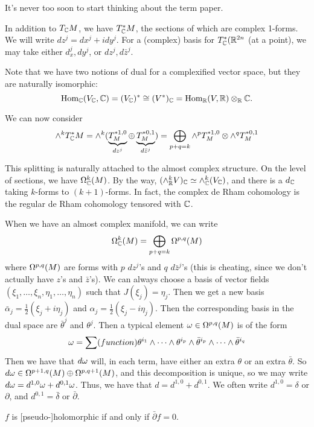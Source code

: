  \setcounter{lecture}{8}

 It's never too soon to start thinking about the term paper.

 In addition to $T_{\mathbb{C}} M$, we have $T_{\mathbb{C}}^* M$, the sections of
 which are complex 1-forms.  We will write $dz^j=dx^j+idy^j$.  For
 a (complex) basis for $T_{\mathbb{C}}^*(\mathbb{R}^{2n}$ (at a point), we may
 take either $d_x^j,dy^j$, or $dz^j,d\bar z^j$.

 Note that we have two notions of dual for a complexified vector
 space, but they are naturally isomorphic:
 \[\text{\rm Hom}_{\mathbb{C}}(V_{\mathbb{C}},\mathbb{C})=(V_{\mathbb{C}})^* \cong (V^*)_{\mathbb{C}} = \text{\rm Hom}_{\mathbb{R}}
 (V,\mathbb{R})\otimes_{\mathbb{R}} \mathbb{C}.\]

 We can now consider \[\wedge^k T^*_{\mathbb{C}} M =
 \wedge^k(\underbrace{T^{*1,0}_M}_{dz^j}\oplus
 \underbrace{T^{*0,1}_M}_{d\bar z^j}) = \bigoplus_{p+q=k} \wedge^p
 T^{*1,0}_M \otimes \wedge^q T^{*0,1}_M\]

 This splitting is naturally attached to the almost complex
 structure.  On the level of sections, we have $\Omega^k_{\mathbb{C}}(M)$.  By
 the way, $(\wedge_{\mathbb{R}}^k V)_{\mathbb{C}} \simeq \wedge_{\mathbb{C}}^k(V_{\mathbb{C}})$, and
 there is a $d_{\mathbb{C}}$ taking $k$-forms to $(k+1)$-forms.  In fact,
 the complex de Rham cohomology is the regular de Rham cohomology
 tensored with $\mathbb{C}$.

 When we have an almost complex manifold, we can write
 \[
    \Omega^k_{\mathbb{C}}(M) = \bigoplus_{p+q=k} \Omega^{p,q}(M)
 \]
 where $\Omega^{p,q}(M)$ are forms with $p$ $dz^j$'s and $q$ $d\bar
 z^j$'s (this is cheating, since we don't actually have $z$'s and
 $\bar z$'s).  We can always choose a basis of vector fields
 $(\xi_1,\dots, \xi_n,\eta_1,\dots, \eta_n)$ such that
 $J(\xi_j)=\eta_j$.  Then we get a new basis $\bar\alpha_j =
 \frac{1}{2}(\xi_j+i\eta_j)$ and $\alpha_j =
 \frac{1}{2}(\xi_j-i\eta_j)$.  Then the corresponding basis in the
 dual space are $\bar \theta^j$ and $\theta^j$.  Then a typical
 element $\omega\in \Omega^{p,q}(M)$ is of the form
 \[
    \omega = \sum (function) \theta^{i_1}\wedge\cdots\wedge
    \theta^{i_p}\wedge \bar \theta^{i_p}\wedge\cdots\wedge
    \bar\theta^{i_q}
 \]
 Then we have that $d\omega$ will, in each term, have either an extra
 $\theta$ or an extra $\bar\theta$.  So $d\omega\in
 \Omega^{p+1,q}(M)\oplus \Omega^{p,q+1}(M)$, and this decomposition is
 unique, so we may write $d\omega = d^{1,0}\omega+d^{0,1}\omega$.  Thus, we
 have that $d=d^{1,0}+d^{0,1}$.  We often write $d^{1,0}=\delta$
 or $\partial$, and $d^{0,1} = \bar\delta$ or $\bar\partial$.

 \begin{lemma}
   $f$ is [pseudo-]holomorphic if and only if $\bar\partial f=0$.
 \end{lemma}

